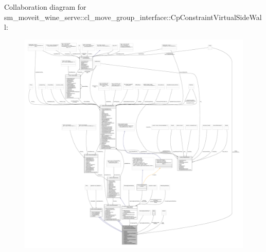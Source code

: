 Collaboration diagram for sm\+\_\+moveit\+\_\+wine\+\_\+serve\+:\+:cl\+\_\+move\+\_\+group\+\_\+interface\+:\+:Cp\+Constraint\+Virtual\+Side\+Wall\+:
\nopagebreak
\begin{figure}[H]
\begin{center}
\leavevmode
\includegraphics[width=350pt]{classsm__moveit__wine__serve_1_1cl__move__group__interface_1_1CpConstraintVirtualSideWall__coll__graph}
\end{center}
\end{figure}
